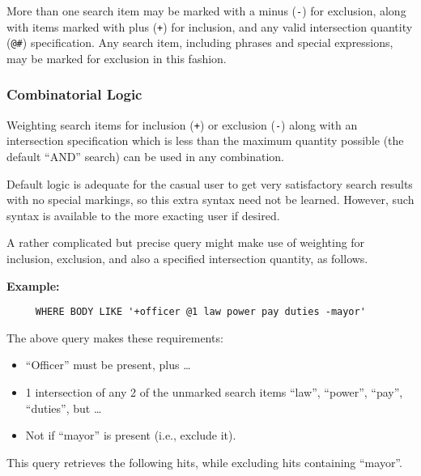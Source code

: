 More than one search item may be marked with a minus (\verb`-`) for
exclusion, along with items marked with plus (\verb`+`) for inclusion,
and any valid intersection quantity (\verb`@#`) specification.  Any
search item, including phrases and special expressions, may be marked
for exclusion in this fashion.

\subsubsection{Combinatorial Logic}

Weighting search items for inclusion (\verb`+`) or exclusion
(\verb`-`) along with an intersection specification which is less than
the maximum quantity possible (the default ``AND'' search) can be used
in any combination.

Default logic is adequate for the casual user to get very satisfactory
search results with no special markings, so this extra syntax need not
be learned.  However, such syntax is available to the more exacting
user if desired.

A rather complicated but precise query might make use of weighting for
inclusion, exclusion, and also a specified intersection quantity, as
follows.

{\bf Example:}
\begin{verbatim}
     WHERE BODY LIKE '+officer @1 law power pay duties -mayor'
\end{verbatim}

The above query makes these requirements:

\begin{itemize}
\item ``Officer'' must be present, plus \ldots

\item 1 intersection of any 2 of the unmarked search items ``law'',
``power'', ``pay'', ``duties'', but \ldots

\item Not if ``mayor'' is present (i.e., exclude it).
\end{itemize}

This query retrieves the following hits, while excluding hits
containing ``mayor''.

